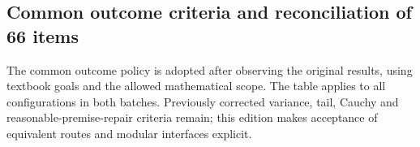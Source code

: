 \subsection[Common outcome criteria and reconciliation of 66 items]{\texorpdfstring{\protect\hypertarget{q2}{}Common outcome criteria and reconciliation of 66 items}{Common outcome criteria and reconciliation of 66 items}}
The common outcome policy is adopted after observing the original results, using textbook goals and the allowed mathematical scope. The table applies to all configurations in both batches. Previously corrected variance, tail, Cauchy and reasonable-premise-repair criteria remain; this edition makes acceptance of equivalent routes and modular interfaces explicit.

\begingroup\small\setlength{\tabcolsep}{3pt}\renewcommand{\arraystretch}{1.14}

